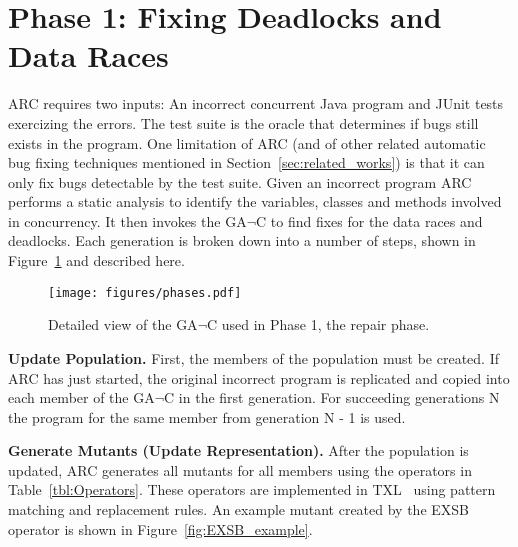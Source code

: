 \documentclass[runningheads,a4paper]{llncs}
\begin{document}
\section{Phase 1: Fixing Deadlocks and Data Races}
\label{sec:Phase1Functional}

ARC requires two inputs: An incorrect concurrent Java program and JUnit tests exercizing the errors. The test suite is the oracle that determines if bugs still exists in the program. One limitation of ARC (and of other related automatic bug fixing techniques mentioned in Section~\ref{sec:related_works}) is that it can only fix bugs detectable by the test suite. Given an incorrect program ARC performs a static analysis to identify the variables, classes and methods involved in concurrency.  It then invokes the GA$\neg$C to find fixes for the data races and deadlocks.  Each generation is broken down into a number of steps, shown in Figure~\ref{fig:Phase1GAnotC} and described here.

\begin{figure}[t!]
  \centering
  \texttt{[image: figures/phases.pdf]}
  \caption{Detailed view of the GA$\neg$C used in Phase 1, the repair phase.}
  \label{fig:Phase1GAnotC}
\end{figure}


\textbf{Update Population.} First, the members of the population must be created.  If ARC has just started, the original incorrect program is replicated and copied into each member of the GA$\neg$C in the first generation.  For succeeding generations N the program for the same member from generation N - 1 is used. %


\textbf{Generate Mutants (Update Representation).} After the population is updated, ARC generates all mutants for all members using the operators in Table~\ref{tbl:Operators}.
These operators are implemented in  TXL~\cite{CHP91} using pattern matching and replacement rules. An example mutant created by the EXSB operator is shown in Figure~\ref{fig:EXSB_example}. 
\end{document}
